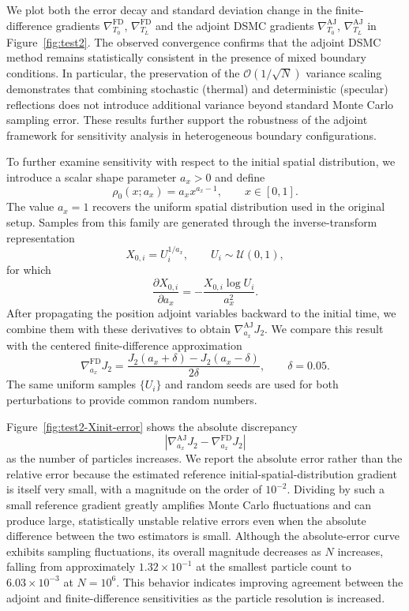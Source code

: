 \documentclass[12pt,nopreprintline]{elsarticle}
\begin{document}
We plot both the error decay and standard deviation change in the finite-difference gradients $\nabla_{T_0}^\text{FD}$, $\nabla_{T_L}^\text{FD}$ and the adjoint DSMC gradients $\nabla_{T_0}^\text{AJ}$, $\nabla_{T_L}^\text{AJ}$ in Figure~\ref{fig:test2}. The observed convergence confirms that the adjoint DSMC method remains statistically consistent in the presence of mixed boundary conditions. In particular, the preservation of the $\mathcal{O}(1/\sqrt{N})$ variance scaling demonstrates that combining stochastic (thermal) and deterministic (specular) reflections does not introduce additional variance beyond standard Monte Carlo sampling error. These results further support the robustness of the adjoint framework for sensitivity analysis in heterogeneous boundary configurations.

{

To further examine sensitivity with respect to the initial spatial distribution, we introduce a scalar shape parameter $a_x>0$ and define
\[
\rho_0(x;a_x)=a_xx^{a_x-1},
\qquad x\in[0,1].
\]
The value $a_x=1$ recovers the uniform spatial distribution used in the original setup. Samples from this family are generated through the inverse-transform representation
\[
X_{0,i}=U_i^{1/a_x},
\qquad U_i\sim\mathcal{U}(0,1),
\]
for which
\[
\frac{\partial X_{0,i}}{\partial a_x}
= -\frac{X_{0,i}\log U_i}{a_x^2}.
\]
After propagating the position adjoint variables backward to the initial time, we combine them with these derivatives to obtain $\nabla_{a_x}^{\mathrm{AJ}}J_2$. We compare this result with the centered finite-difference approximation
\[
\nabla_{a_x}^{\mathrm{FD}}J_2
=
\frac{J_2(a_x+\delta)-J_2(a_x-\delta)}{2\delta},
\qquad \delta=0.05.
\]
The same uniform samples $\{U_i\}$ and random seeds are used for both perturbations to provide common random numbers.

Figure~\ref{fig:test2-Xinit-error} shows the absolute discrepancy
\[
\left|
\nabla_{a_x}^{\mathrm{AJ}}J_2
-
\nabla_{a_x}^{\mathrm{FD}}J_2
\right|
\]
as the number of particles increases. We report the absolute error rather than the relative error because the estimated reference initial-spatial-distribution gradient is itself very small, with a magnitude on the order of $10^{-2}$. Dividing by such a small reference gradient greatly amplifies Monte Carlo fluctuations and can produce large, statistically unstable relative errors even when the absolute difference between the two estimators is small. Although the absolute-error curve exhibits sampling fluctuations, its overall magnitude decreases as $N$ increases, falling from approximately $1.32\times10^{-1}$ at the smallest particle count to $6.03\times10^{-3}$ at $N=10^6$. This behavior indicates improving agreement between the adjoint and finite-difference sensitivities as the particle resolution is increased.

}
\end{document}
